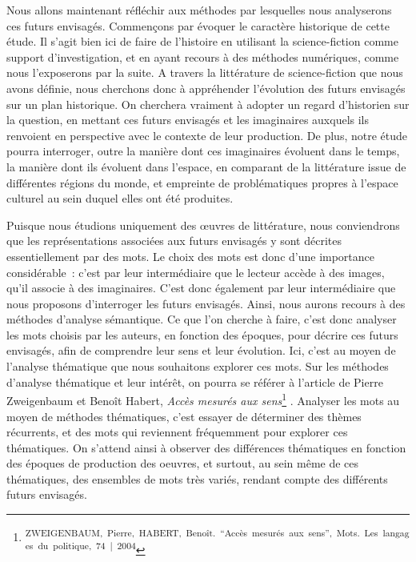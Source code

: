 \documentclass[letterpaper,portrait,12pt]{article}
\begin{document}
Nous allons maintenant r\'{e}fl\'{e}chir aux m\'{e}thodes par lesquelles nous analyserons ces futurs envisag\'{e}s. Commen\c{c}ons par \'{e}voquer le caract\`{e}re historique de cette \'{e}tude. Il s'agit bien ici de faire de l'histoire en utilisant la science-fiction comme support d'investigation, et en ayant recours \`{a} des m\'{e}thodes num\'{e}riques, comme nous l'exposerons par la suite. A travers la litt\'{e}rature de science-fiction que nous avons d\'{e}finie, nous cherchons donc \`{a} appr\'{e}hender l'\'{e}volution des futurs envisag\'{e}s sur un plan historique. On cherchera vraiment \`{a} adopter un regard d'historien sur la question, en mettant ces futurs envisag\'{e}s et les imaginaires auxquels ils renvoient en perspective avec le contexte de leur production. De plus, notre \'{e}tude pourra interroger, outre la mani\`{e}re dont ces imaginaires \'{e}voluent dans le temps, la mani\`{e}re dont ils \'{e}voluent dans l'espace, en comparant de la litt\'{e}rature issue de diff\'{e}rentes r\'{e}gions du monde, et empreinte de probl\'{e}matiques propres \`{a} l'espace culturel au sein duquel elles ont \'{e}t\'{e} produites. 





	Puisque nous \'{e}tudions uniquement des \oe{}uvres de litt\'{e}rature, nous conviendrons que les repr\'{e}sentations associ\'{e}es aux futurs envisag\'{e}s y sont d\'{e}crites essentiellement par des mots. Le choix des mots est donc d'une importance consid\'{e}rable : c'est par leur interm\'{e}diaire que le lecteur acc\`{e}de \`{a} des images, qu'il associe \`{a} des imaginaires. C'est donc \'{e}galement par leur interm\'{e}diaire que nous proposons d'interroger les futurs envisag\'{e}s. Ainsi, nous aurons recours \`{a} des m\'{e}thodes d'analyse s\'{e}mantique. Ce que l'on cherche \`{a} faire, c'est donc analyser les mots choisis par les auteurs, en fonction des \'{e}poques, pour d\'{e}crire ces futurs envisag\'{e}s, afin de comprendre leur sens et leur \'{e}volution. Ici, c'est au moyen de l'analyse th\'{e}matique que nous souhaitons explorer ces mots. Sur les m\'{e}thodes d'analyse th\'{e}matique et leur int\'{e}r\^{e}t, on pourra se r\'{e}f\'{e}rer \`{a} l'article de Pierre Zweigenbaum et Beno\^{i}t Habert, \emph{Acc\`{e}s mesur\'{e}s aux sens}\footnote{\textsuperscript{\newpage
}\textsuperscript{	ZWEIGENBAUM,\ Pierre,\ HABERT,\ Beno\^{i}t.\ {``}Acc\`{e}s\ mesur\'{e}s\ aux\ sens'',\ Mots.\ Les\ langages\ du\ politique,\ 74\ |\ 2004}} . Analyser les mots au moyen de m\'{e}thodes th\'{e}matiques, c'est essayer de d\'{e}terminer des th\`{e}mes r\'{e}currents, et des mots qui reviennent fr\'{e}quemment pour explorer ces th\'{e}matiques. On s'attend ainsi \`{a} observer des diff\'{e}rences th\'{e}matiques en fonction des \'{e}poques de production des oeuvres, et surtout, au sein m\^{e}me de ces th\'{e}matiques, des ensembles de mots tr\`{e}s vari\'{e}s, rendant compte des diff\'{e}rents futurs envisag\'{e}s. 
\end{document}
